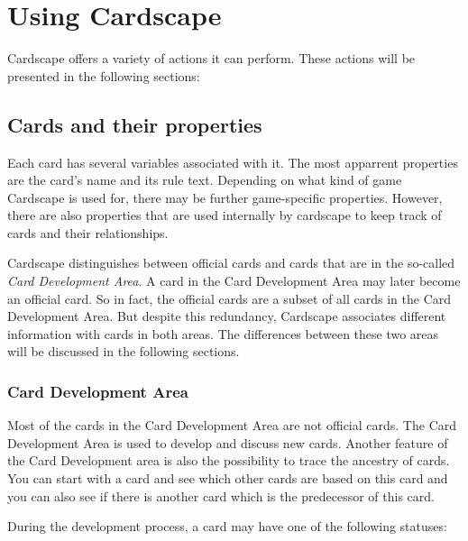 \documentclass[a4paper, 11pt]{scrbook}
\begin{document}
\chapter{Using Cardscape}
Cardscape offers a variety of actions it can perform. These actions will be presented in the following sections:


\section{Cards and their properties}
Each card has several variables associated with it. The most apparrent properties are the card's name and its rule text. Depending on what kind of game Cardscape is used for, there may be further game-specific properties. However, there are also properties that are used internally by cardscape to keep track of cards and their relationships.

Cardscape distinguishes between official cards and cards that are in the so-called \emph{Card Development Area}. A card in the Card Development Area may later become an official card. So in fact, the official cards are a subset of all cards in the Card Development Area. But despite this redundancy, Cardscape associates different information with cards in both areas. The differences between these two areas will be discussed in the following sections.

\subsection{Card Development Area}\label{CardDevArea}
Most of the cards in the Card Development Area are not official cards. The Card Development Area is used to develop and discuss new cards. Another feature of the Card Development area is also the possibility to trace the ancestry of cards. You can start with a card and see which other cards are based on this card and you can also see if there is another card which is the predecessor of this card.

During the development process, a card may have one of the following statuses:
\end{document}
